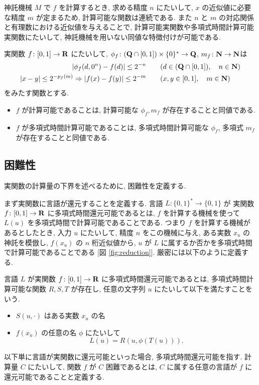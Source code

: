  神託機械 $M$ で $f$ を計算するとき, 求める精度 $n$ にたいして,
 $x$ の近似値に必要な精度 $m$ が定まるため,
 計算可能な関数は連続である.
 また $n$ と $m$ の対応関係と有理数における近似値を与えることで,
 計算可能実関数や多項式時間計算可能実関数にたいして,
 神託機械を用いない同値な特徴付けが可能である.

 \begin{lemma}
  \label{lem:type1representation}
  実関数 $f\colon [0,1] \to \mathbf R$ にたいして,
  $\phi_f\colon (\mathbf Q \cap [0, 1]) \times \{0\}^* \to \mathbf Q$, $m_f\colon \mathbf N \to \mathbf N$は
  \begin{align}
   |\phi_f(d, 0^n) - f(d)| \le 2^{-n} 
   &\qquad (d \in (\mathbf Q \cap [0,1]), \quad n \in \mathbf N)\\
   |x-y| \le 2^{-p_f(m)} \Rightarrow |f(x) - f(y)| \le 2^{-m}
   &\qquad (x, y \in [0, 1], \quad m \in \mathbf N)
  \end{align}
 をみたす関数とする.
  \begin{itemize}
   \item $f$ が計算可能であることは, 計算可能な $\phi_f, m_f$ が存在することと同値である. 
   \item $f$ が多項式時間計算可能であることは, 多項式時間計算可能な 
  $\phi_f$, 多項式 $m_f$ が存在することと同値である.
  \end{itemize} 
\end{lemma}

\subsection{困難性}

 実関数の計算量の下界を述べるために, 困難性を定義する.

 まず実関数に言語が還元することを定義する.
 言語 $L \colon \{0, 1\} ^* \to \{0, 1\}$ が
 実関数 $f\colon [0,1] \to \mathbf R$ に多項式時間還元可能であるとは,
 $f$ を計算する機械を使って $L(u)$ を多項式時間で計算可能であることである.
 つまり $f$ を計算する機械があるとしたとき, 入力 $u$ にたいして,
 精度 $n$ をこの機械に与え, ある実数 $x_u$ の神託を模倣し, $f(x_u)$ の $n$ 桁近似値から,
 $u$ が $L$ に属するか否かを多項式時間で計算可能であることである
 [図 \ref{fig:reduction}].
 厳密には以下のように定義する.

 \begin{definition}[多項式時間還元可能]
  言語 $L$ が実関数 $f\colon [0,1] \to \mathbf R$ に多項式時間還元可能であるとは, 
  多項式時間計算可能な関数 $R,S,T$ が存在し, 
  任意の文字列 $u$ にたいして以下を満たすことをいう. 
  \begin{itemize}
   \item $S(u, \cdot)$ はある実数 $x_u$ の名
   \item $f(x_u)$ の任意の名 $\phi$ にたいして
	 \[
	  L(u) = R(u, \phi(T(u))).
	 \]
  \end{itemize}
 \end{definition}
 以下単に言語が実関数に還元可能といった場合, 多項式時間還元可能を指す.
 計算量 $C$ にたいして, 関数 $f$ が $C$ 困難であるとは,
 $C$ に属する任意の言語が $f$ に還元可能であることと定義する.

